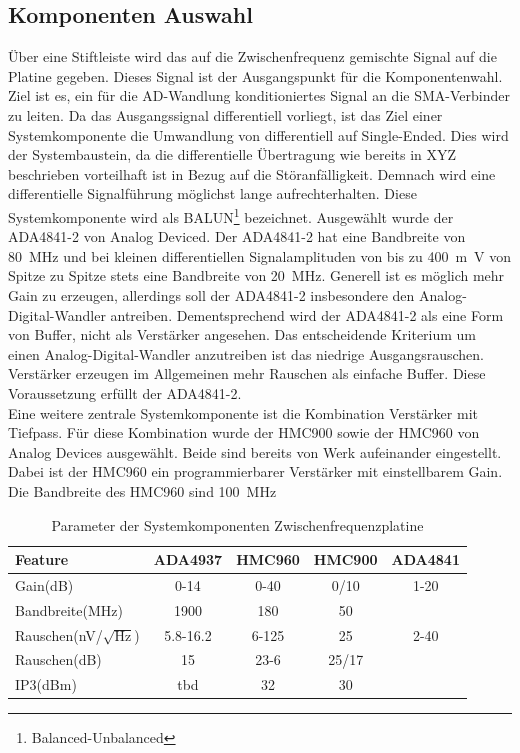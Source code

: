 \subsection{Komponenten Auswahl}
Über eine Stiftleiste wird das auf die Zwischenfrequenz gemischte Signal auf die Platine gegeben. Dieses Signal ist der Ausgangspunkt für die Komponentenwahl. Ziel ist es, ein für die AD-Wandlung konditioniertes Signal an die SMA-Verbinder zu leiten. Da das Ausgangssignal differentiell vorliegt, ist das Ziel einer Systemkomponente die Umwandlung von differentiell auf Single-Ended. Dies wird der Systembaustein, da die differentielle Übertragung wie bereits in XYZ beschrieben vorteilhaft ist in Bezug auf die Störanfälligkeit. Demnach wird eine differentielle Signalführung möglichst lange aufrechterhalten. Diese Systemkomponente wird als BALUN\footnote{Balanced-Unbalanced} bezeichnet. Ausgewählt wurde der ADA4841-2 von Analog Deviced. Der ADA4841-2 hat eine Bandbreite von \SI{80}{\mega\hertz} und bei kleinen differentiellen Signalamplituden von bis zu \SI{400}{m\volt} von Spitze zu Spitze stets eine Bandbreite von \SI{20}{\mega\hertz}. Generell ist es möglich mehr Gain zu erzeugen, allerdings soll der ADA4841-2 insbesondere den Analog-Digital-Wandler antreiben. Dementsprechend wird der ADA4841-2 als eine Form von Buffer, nicht als Verstärker angesehen. Das entscheidende Kriterium um einen Analog-Digital-Wandler anzutreiben ist das niedrige Ausgangsrauschen. Verstärker erzeugen im Allgemeinen mehr Rauschen als einfache Buffer. Diese Voraussetzung erfüllt der ADA4841-2. \\
Eine weitere zentrale Systemkomponente ist die Kombination Verstärker mit Tiefpass. Für diese Kombination wurde der HMC900 sowie der HMC960 von Analog Devices ausgewählt. Beide sind bereits von Werk aufeinander eingestellt. Dabei ist der HMC960 ein programmierbarer Verstärker mit einstellbarem Gain. Die Bandbreite des HMC960 sind \SI{100}{\mega\hertz}
\begin{table}[tbp]
  \centering
  \begin{tabular}{l c c c c}
    Feature & ADA4937 & HMC960 & HMC900 & ADA4841\\
    \hline
    Gain(dB) & 0-14 & 0-40 & 0/10 & 1-20 \\
    Bandbreite(MHz) & 1900 & 180 & 50 &\\
    Rauschen(nV/$\sqrt{\text{Hz}}$) & 5.8-16.2& 6-125 & 25 &2-40\\
    Rauschen(dB) & 15 & 23-6 &25/17 & \\
    IP3(dBm) & tbd & 32 &30&\\
  \end{tabular}
  \caption{Parameter der Systemkomponenten Zwischenfrequenzplatine}
  \label{tab:IFKomponenten}
\end{table}

